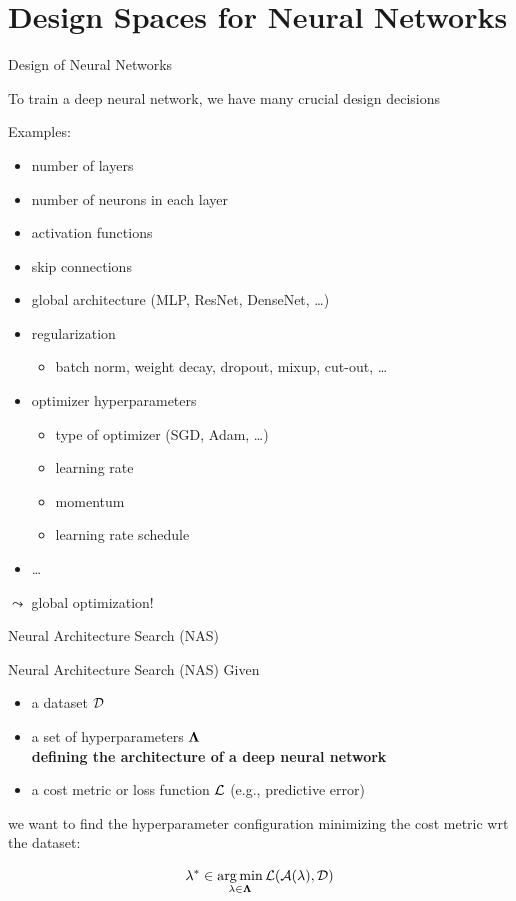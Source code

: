 \section{Design Spaces for Neural Networks}
\begin{frame}[c]{Design of Neural Networks}

To train a deep neural network, we have many crucial design decisions \hands
\pause

Examples:
\begin{itemize}
  \item number of layers
  \item number of neurons in each layer
  \item activation functions
  \item skip connections
  \item global architecture (MLP, ResNet, DenseNet, \ldots)
  \item regularization
  \begin{itemize}
    \item batch norm, weight decay, dropout, mixup, cut-out, \ldots 
  \end{itemize}
  \item optimizer hyperparameters
  \begin{itemize}
    \item type of optimizer (SGD, Adam, \ldots)
    \item learning rate
    \item momentum
    \item learning rate schedule
  \end{itemize}
  \item \ldots
\end{itemize}

$\leadsto$ global optimization!

\end{frame}
\begin{frame}[c]{Neural Architecture Search (NAS)}

\begin{block}{Neural Architecture Search (NAS)}
Given
\begin{itemize}
  \item a dataset $\mathcal{D}$
  \item a set of hyperparameters $\mathbf{\Lambda}$\\ \textbf{defining the architecture of a deep neural network}
  \item a cost metric or loss function $\mathcal{L}$ (e.g., predictive error)
\end{itemize}
we want to find the hyperparameter configuration minimizing the cost metric wrt the dataset:

\begin{equation}
\mathbf{\lambda}^* \in \operatorname*{arg\,min}_{\mathbf{\lambda} \in \mathbf{\Lambda}} \mathcal{L}(\mathcal{A}(\mathbf{\lambda}), \mathcal{D}) \nonumber
\end{equation}
\end{block}

\end{frame}
